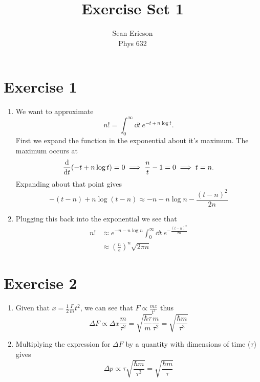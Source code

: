 \documentclass[12pt]{article}
\newcommand{\cint}[2]{\int_{#1}^{#2}}
\newcommand{\cintd}[3]{\cint{#1}{#2}\dd#3\:}
\begin{document}
	
\title{Exercise Set 1}
\author{Sean Ericson \\ Phys 632}
\maketitle

\section*{Exercise 1}
\begin{enumerate}[label=(\alph*)]
    \item We want to approximate
    \[ n! = \cintd{0}{\infty}{t} e^{-t + n\log{t}}. \]
    First we expand the function in the exponential about it's maximum. The maximum occurs at
    \[ \dv{t}(-t + n\log{t}) = 0 \implies \frac{n}{t} - 1 = 0 \implies t = n. \]
    Expanding about that point gives
    \[ -(t - n) + n\log(t - n) \approx -n - n\log{n} - \frac{(t-n)^2}{2n} \]

    \item Plugging this back into the exponential we see that
    \begin{align*}
        n! & \approx e^{-n - n\log{n}}\cintd{0}{\infty}{t}e^{-\frac{(t-n)^2}{2n}} \\
        & \approx \left(\frac{n}{e}\right)^n \sqrt{2\pi n}
    \end{align*}
\end{enumerate}



\section*{Exercise 2}
\begin{enumerate}[label=(\alph*)]
    \item Given that $x = \frac{1}{2}\frac{F}{m}t^2$, we can see that $F \propto \frac{mx}{t^2}$ thus
    \[ \Delta F \propto \Delta x \frac{m}{\tau^2} = \sqrt{\frac{\hbar\tau}{m}}\frac{m}{\tau^2} = \sqrt{\frac{\hbar m}{\tau^3}} \]

    \item Multiplying the expression for $\Delta F$ by a quantity with dimensions of time ($\tau$) gives
    \[ \Delta p \propto \tau\sqrt{\frac{\hbar m}{\tau^3}} = \sqrt{\frac{\hbar m}{\tau}} \]
\end{enumerate}
    
\end{document}
